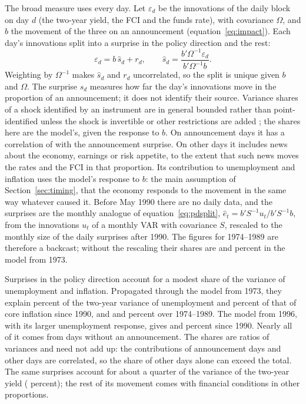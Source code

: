 \documentclass[11pt]{article}
\begin{document}
The broad measure uses every day. Let $\varepsilon_d$ be the innovations of the daily block on day $d$ (the two-year yield, the FCI and the funds rate), with covariance $\Omega$, and $b$ the movement of the three on an announcement (equation~\eqref{eq:impact}). Each day's innovations split into a surprise in the policy direction and the rest:
\begin{equation}
\varepsilon_d = b\,\hat s_d + r_d, \qquad \hat s_d = \frac{b'\Omega^{-1}\varepsilon_d}{b'\Omega^{-1}b}. \label{eq:pdsplit}
\end{equation}
Weighting by $\Omega^{-1}$ makes $\hat s_d$ and $r_d$ uncorrelated, so the split is unique given $b$ and $\Omega$. The surprise $\hat s_d$ measures how far the day's innovations move in the proportion of an announcement; it does not identify their source. Variance shares of a shock identified by an instrument are in general bounded rather than point-identified unless the shock is invertible or other restrictions are added \citep{plagborg2022}; the shares here are the model's, given the response to $b$. On announcement days it has a correlation of  with the announcement surprise. On other days it includes news about the economy, earnings or risk appetite, to the extent that such news moves the rates and the FCI in that proportion. Its contribution to unemployment and inflation uses the model's response to $b$: the main assumption of Section~\ref{sec:timing}, that the economy responds to the movement in the same way whatever caused it. Before May 1990 there are no daily data, and the surprises are the monthly analogue of equation~\eqref{eq:pdsplit}, $\hat e_t = b'S^{-1}u_t / b'S^{-1}b$, from the innovations $u_t$ of a monthly VAR with covariance $S$, rescaled to the monthly size of the daily surprises after 1990. The figures for 1974--1989 are therefore a backcast; without the rescaling their shares are  and  percent in the model from 1973.

Surprises in the policy direction account for a modest share of the variance of unemployment and inflation. Propagated through the model from 1973, they explain  percent of the two-year variance of unemployment and  percent of that of core inflation since 1990, and  and  percent over 1974--1989. The model from 1996, with its larger unemployment response, gives  and  percent since 1990. Nearly all of it comes from days without an announcement. The shares are ratios of variances and need not add up: the contributions of announcement days and other days are correlated, so the share of other days alone can exceed the total. The same surprises account for about a quarter of the variance of the two-year yield ( percent); the rest of its movement comes with financial conditions in other proportions.
\end{document}
